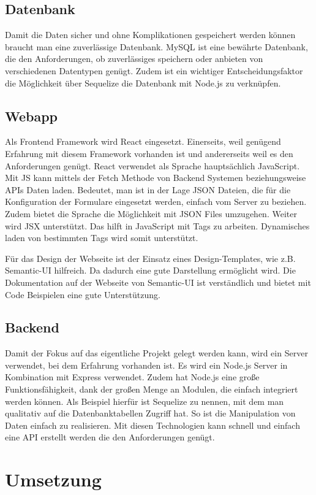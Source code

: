 \documentclass[a4paper,11pt]{scrreprt}
\begin{document}
\section{Datenbank}
Damit die Daten sicher und ohne Komplikationen gespeichert werden können braucht man eine zuverlässige Datenbank. MySQL ist eine bewährte Datenbank, die den Anforderungen, ob  zuverlässiges speichern oder anbieten von verschiedenen Datentypen genügt. Zudem ist ein wichtiger Entscheidungsfaktor die Möglichkeit über Sequelize die Datenbank mit Node.js zu verknüpfen. 

\section{Webapp}
Als Frontend Framework wird React eingesetzt. Einerseits, weil genügend Erfahrung mit diesem Framework vorhanden ist und andererseits weil es den Anforderungen genügt. 
React verwendet als Sprache hauptsächlich JavaScript. Mit JS kann mittels der Fetch Methode von Backend Systemen beziehungsweise APIs Daten laden. Bedeutet, man ist in der Lage JSON Dateien, die für die Konfiguration der Formulare eingesetzt werden, einfach vom Server zu beziehen. Zudem bietet die Sprache die Möglichkeit mit JSON Files umzugehen. Weiter wird JSX unterstützt. Das hilft in JavaScript mit Tags zu arbeiten. Dynamisches laden von bestimmten Tags wird somit unterstützt. 


Für das Design der Webseite ist der Einsatz eines Design-Templates, wie z.B. Semantic-UI
hilfreich. Da dadurch eine gute Darstellung ermöglicht wird. 
Die Dokumentation auf der Webseite von Semantic-UI ist verständlich und
bietet mit Code Beispielen eine gute Unterstützung.
\\
\section{Backend}
Damit der Fokus auf das eigentliche Projekt gelegt werden kann, wird ein Server verwendet, bei dem Erfahrung vorhanden ist. Es wird ein Node.js Server in Kombination mit Express verwendet. Zudem hat Node.js eine große Funktionsfähigkeit, dank der großen Menge an Modulen, die einfach integriert werden können. Als Beispiel hierfür ist Sequelize zu nennen, mit dem man qualitativ auf die Datenbanktabellen Zugriff hat. So ist die Manipulation von Daten einfach zu realisieren. Mit diesen Technologien kann schnell und einfach eine API erstellt werden die den Anforderungen genügt.

\chapter{Umsetzung}
\end{document}

